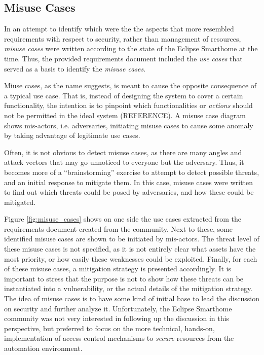 \documentclass[12pt]{article}
\begin{document}
\subsection{Misuse Cases}

In an attempt to identify which were the the aspects that more resembled requirements with respect to security, rather than management of resources, \emph{misuse cases} were written according to the state of the Eclipse Smarthome at the time. Thus, the provided requirements document included the \emph{use cases} that served as a basis to identify the \emph{misuse cases}. 

Miuse cases, as the name suggests, is meant to cause the opposite consequence of a typical use case. That is, instead of designing the system to cover a certain functionality, the intention is to pinpoint which functionalities or \emph{actions} should not be permitted in the ideal system (REFERENCE). A misuse case diagram shows mis-actors, i.e. adversaries, initiating misuse cases to cause some anomaly by taking advantage of legitimate use cases.

Often, it is not obvious to detect misuse cases, as there are many angles and attack vectors that may go unnoticed to everyone but the adversary. Thus, it becomes more of a ``brainstorming'' exercise to attempt to detect possible threats, and an initial response to mitigate them. In this case, misuse cases were written to find out which threats could be posed by adversaries, and how these could be mitigated.

Figure \ref{fig:misuse_cases} shows on one side the use cases extracted from the requirements document created from the community. Next to these, some identified misuse cases are shown to be initiated by mis-actors. The threat level of these misuse cases is not specified, as it is not entirely clear what assets have the most priority, or how easily these weaknesses could be exploited. Finally, for each of these misuse cases, a mitigation strategy is presented accordingly. It is important to stress that the purpose is not to show how these threats can be instantiated into a vulnerability, or the actual details of the mitigation strategy. The idea of misuse cases is to have some kind of initial base to lead the discussion on security and further analyze it. Unfortunately, the Eclipse Smarthome community was not very interested in following up the discussion in this perspective, but preferred to focus on the more technical, hands-on, implementation of access control mechanisms to \emph{secure} resources from the automation environment.
\end{document}
